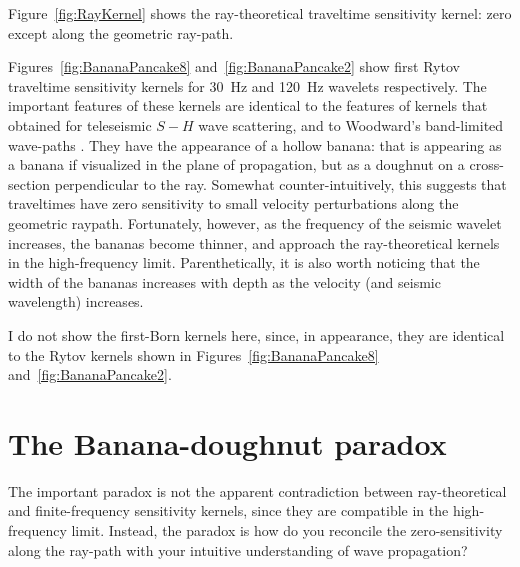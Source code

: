 \par
Figure~\ref{fig:RayKernel} shows the ray-theoretical traveltime
sensitivity kernel: zero except along the geometric ray-path.  

\par
Figures~\ref{fig:BananaPancake8} and~\ref{fig:BananaPancake2} show
first Rytov traveltime sensitivity kernels for 30~Hz and 120~Hz
wavelets respectively.  The important features of these kernels are
identical to the features of kernels that \cite{marquering99}
obtained for teleseismic $S-H$ wave scattering, and to Woodward's
band-limited wave-paths \cite[]{woodward92}.  They have the
appearance of a  hollow banana: that is appearing as a banana if
visualized in the plane of propagation, but as a doughnut on a
cross-section perpendicular to the ray.  
Somewhat counter-intuitively, this suggests that traveltimes
have zero sensitivity to small velocity perturbations along the
geometric raypath.  
Fortunately, however, as the frequency of the seismic wavelet increases,
the bananas become thinner, and approach the ray-theoretical kernels
in the high-frequency limit.
Parenthetically, it is also worth noticing that the width of the
bananas increases with depth as the velocity (and seismic wavelength)
increases. 

\par
I do not show the first-Born kernels here, since, in appearance, they 
are identical to the Rytov kernels shown in 
Figures~\ref{fig:BananaPancake8} and~\ref{fig:BananaPancake2}.

\section{The Banana-doughnut paradox}
The important paradox is not the apparent contradiction between
ray-theoretical and finite-frequency sensitivity kernels, 
since they are compatible in the high-frequency limit. 
Instead, the paradox is how do you reconcile the zero-sensitivity
along the ray-path with your intuitive understanding of wave
propagation? 

